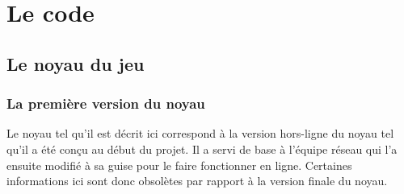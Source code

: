 \documentclass[a4paper,11pt]{article}
\begin{document}
\newpage


\section{Le code}

\subsection{Le noyau du jeu}

\subsubsection{La première version du noyau}

Le noyau tel qu’il est décrit ici correspond à la version hors-ligne du noyau tel qu’il a été conçu au début du projet. Il a servi de base à l’équipe réseau qui l’a ensuite modifié à sa guise pour le faire fonctionner en ligne. Certaines informations ici sont donc obsolètes par rapport à la version finale du noyau. \\
\end{document}
